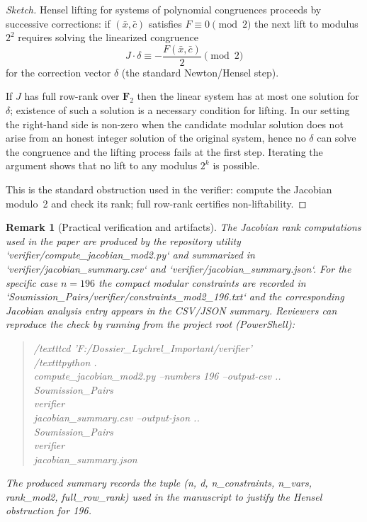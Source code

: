 \documentclass[12pt,a4paper]{article}
\newtheorem{remark}[theorem]{Remark}
\begin{document}
\begin{proof}[Sketch]
Hensel lifting for systems of polynomial congruences proceeds by successive
corrections: if $(\bar x,\bar c)$ satisfies $F\equiv 0\pmod 2$ the next lift
to modulus $2^2$ requires solving the linearized congruence
$$J\cdot \delta \equiv -\frac{F(\bar x,\bar c)}{2} \pmod 2$$
for the correction vector $\delta$ (the standard Newton/Hensel step).

If $J$ has full row-rank over $\mathbf{F}_2$ then the linear system has at
most one solution for $\delta$; existence of such a solution is a necessary
condition for lifting. In our setting the right-hand side is non-zero when
the candidate modular solution does not arise from an honest integer solution
of the original system, hence no $\delta$ can solve the congruence and the
lifting process fails at the first step. Iterating the argument shows that no
lift to any modulus $2^k$ is possible.

This is the standard obstruction used in the verifier: compute the Jacobian
modulo~2 and check its rank; full row-rank certifies non-liftability.
\end{proof}

\begin{remark}[Practical verification and artifacts]
The Jacobian rank computations used in the paper are produced by the
repository utility `verifier/compute_jacobian_mod2.py` and summarized in
`verifier/jacobian_summary.csv` and `verifier/jacobian_summary.json`.
For the specific case $n=196$ the compact modular constraints are recorded in
`Soumission_Pairs/verifier/constraints_mod2_196.txt` and the corresponding
Jacobian analysis entry appears in the CSV/JSON summary. Reviewers can
reproduce the check by running from the project root (PowerShell):
\begin{quote}\small
	/texttt{cd 'F:/Dossier_Lychrel_Important/verifier'}\\
	/texttt{python .\\compute_jacobian_mod2.py --numbers 196 --output-csv ..\\Soumission_Pairs\\verifier\\jacobian_summary.csv --output-json ..\\Soumission_Pairs\\verifier\\jacobian_summary.json}
\end{quote}
The produced summary records the tuple (n, d, n_constraints, n_vars, rank_mod2,
full_row_rank) used in the manuscript to justify the Hensel obstruction for
196.
\end{remark}
\end{document}
